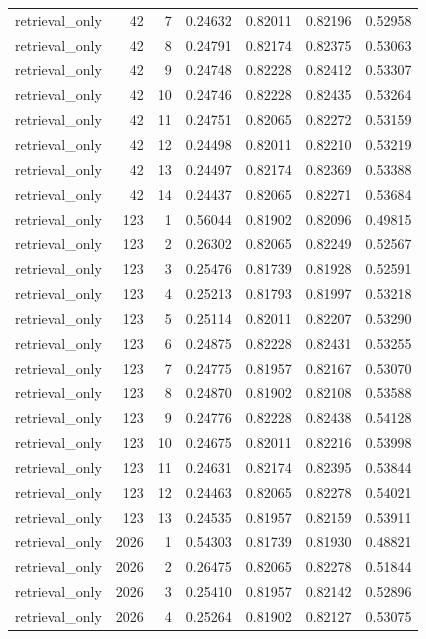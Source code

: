 \begin{tabular}{lrrrrrr}
retrieval_only & 42 & 7 & 0.24632 & 0.82011 & 0.82196 & 0.52958 \\
retrieval_only & 42 & 8 & 0.24791 & 0.82174 & 0.82375 & 0.53063 \\
retrieval_only & 42 & 9 & 0.24748 & 0.82228 & 0.82412 & 0.53307 \\
retrieval_only & 42 & 10 & 0.24746 & 0.82228 & 0.82435 & 0.53264 \\
retrieval_only & 42 & 11 & 0.24751 & 0.82065 & 0.82272 & 0.53159 \\
retrieval_only & 42 & 12 & 0.24498 & 0.82011 & 0.82210 & 0.53219 \\
retrieval_only & 42 & 13 & 0.24497 & 0.82174 & 0.82369 & 0.53388 \\
retrieval_only & 42 & 14 & 0.24437 & 0.82065 & 0.82271 & 0.53684 \\
retrieval_only & 123 & 1 & 0.56044 & 0.81902 & 0.82096 & 0.49815 \\
retrieval_only & 123 & 2 & 0.26302 & 0.82065 & 0.82249 & 0.52567 \\
retrieval_only & 123 & 3 & 0.25476 & 0.81739 & 0.81928 & 0.52591 \\
retrieval_only & 123 & 4 & 0.25213 & 0.81793 & 0.81997 & 0.53218 \\
retrieval_only & 123 & 5 & 0.25114 & 0.82011 & 0.82207 & 0.53290 \\
retrieval_only & 123 & 6 & 0.24875 & 0.82228 & 0.82431 & 0.53255 \\
retrieval_only & 123 & 7 & 0.24775 & 0.81957 & 0.82167 & 0.53070 \\
retrieval_only & 123 & 8 & 0.24870 & 0.81902 & 0.82108 & 0.53588 \\
retrieval_only & 123 & 9 & 0.24776 & 0.82228 & 0.82438 & 0.54128 \\
retrieval_only & 123 & 10 & 0.24675 & 0.82011 & 0.82216 & 0.53998 \\
retrieval_only & 123 & 11 & 0.24631 & 0.82174 & 0.82395 & 0.53844 \\
retrieval_only & 123 & 12 & 0.24463 & 0.82065 & 0.82278 & 0.54021 \\
retrieval_only & 123 & 13 & 0.24535 & 0.81957 & 0.82159 & 0.53911 \\
retrieval_only & 2026 & 1 & 0.54303 & 0.81739 & 0.81930 & 0.48821 \\
retrieval_only & 2026 & 2 & 0.26475 & 0.82065 & 0.82278 & 0.51844 \\
retrieval_only & 2026 & 3 & 0.25410 & 0.81957 & 0.82142 & 0.52896 \\
retrieval_only & 2026 & 4 & 0.25264 & 0.81902 & 0.82127 & 0.53075 \\

\end{tabular}
